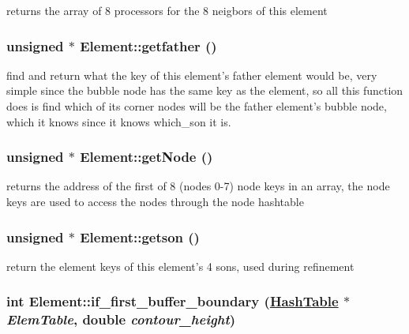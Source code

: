 returns the array of 8 processors for the 8 neigbors of this element 

\hypertarget{classElement_a22}{
\subsubsection[getfather]{\setlength{\rightskip}{0pt plus 5cm}unsigned $\ast$ Element::getfather ()}}
\label{classElement_a22}


find and return what the key of this element's father element would be, very simple since the bubble node has the same key as the element, so all this function does is find which of its corner nodes will be the father element's bubble node, which it knows since it knows which\_\-son it is. 

\hypertarget{classElement_a10}{
\subsubsection[getNode]{\setlength{\rightskip}{0pt plus 5cm}unsigned $\ast$ Element::get\-Node ()}}
\label{classElement_a10}


returns the address of the first of 8 (nodes 0-7) node keys in an array, the node keys are used to access the nodes through the node hashtable 

\hypertarget{classElement_a24}{
\subsubsection[getson]{\setlength{\rightskip}{0pt plus 5cm}unsigned $\ast$ Element::getson ()}}
\label{classElement_a24}


return the element keys of this element's 4 sons, used during refinement 

\hypertarget{classElement_a113}{
\subsubsection[if\_\-first\_\-buffer\_\-boundary]{\setlength{\rightskip}{0pt plus 5cm}int Element::if\_\-first\_\-buffer\_\-boundary (\hyperlink{classHashTable}{Hash\-Table} $\ast$ {\em Elem\-Table}, double {\em contour\_\-height})}}
\label{classElement_a113}


